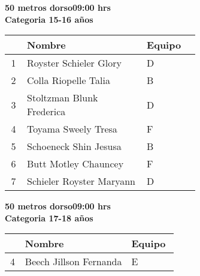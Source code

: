 \begin{minipage}{0.95\linewidth}\vspace{0.5cm} 
\begin{flushleft}
\textbf{
\hspace{-0.15cm}50 metros dorso\hspace{1.5cm}09:00 hrs \\Categoria 15-16 años}\vspace{-0.2cm} 
\end{flushleft}
\begin{tabular}{cp{0.63\linewidth}l}
\hline
& \textbf{Nombre} & \textbf{Equipo} \\ \hline
1 & Royster Schieler Glory & D \\ 
2 & Colla Riopelle Talia & B \\ 
3 & Stoltzman Blunk Frederica & D \\ 
4 & Toyama Sweely Tresa & F \\ 
5 & Schoeneck Shin Jesusa & B \\ 
6 & Butt Motley Chauncey & F \\ 
7 & Schieler Royster Maryann & D \\ 
\end{tabular}
\end{minipage}
\begin{minipage}{0.95\linewidth}\vspace{0.5cm} 
\begin{flushleft}
\textbf{
\hspace{-0.15cm}50 metros dorso\hspace{1.5cm}09:00 hrs \\Categoria 17-18 años}\vspace{-0.2cm} 
\end{flushleft}
\begin{tabular}{cp{0.63\linewidth}l}
\hline
& \textbf{Nombre} & \textbf{Equipo} \\ \hline
4 & Beech Jillson Fernanda & E \\ 
\end{tabular}
\end{minipage}
